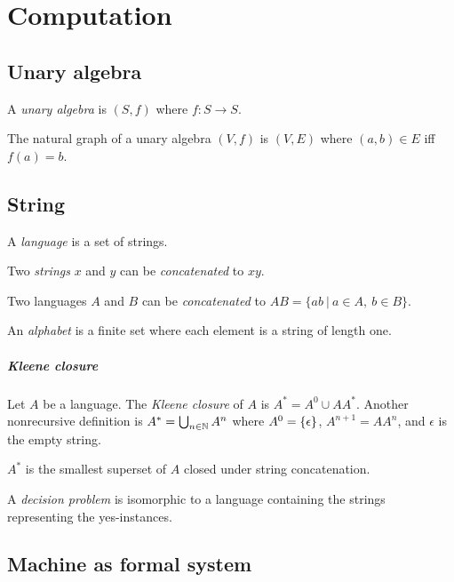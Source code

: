 \chapter{Computation}

\section{Unary algebra}

%
A \emph{unary algebra} is \((S,f)\) where \(f : S \to S\).

The natural graph of a unary algebra \((V,f)\) is \((V,E)\)
where \((a,b) \in E\) iff \(f(a) = b\).

\section{String}

%
A \emph{language} is a set of strings.

Two
%
\emph{strings}
\(x\) and \(y\) can be
%
%
\emph{concatenated} to \(xy\).

Two languages \(A\) and \(B\) can be
%
%
\emph{concatenated} to
\(AB = \{ ab ~|~ a \in A, ~ b \in B \}\).

%
An \emph{alphabet} is a finite set where each element is a string of length one.

\paragraph{Kleene closure}
Let \(A\) be a language.
The
%
%
%
\emph{Kleene closure}
of \(A\) is \(A^* = A^0 \cup AA^*\).
Another nonrecursive definition is
\( A^* = \bigcup_{n \in \mathbb{N}} A^n \)
where \( A^0 = \{\epsilon\} \),
\( A^{n+1} = A A^n \),
and \(\epsilon\) is the
%
%
empty string.

\(A^*\) is the smallest superset of \(A\)
closed under string concatenation.

A \emph{decision problem} is isomorphic to a language
containing the strings representing the yes-instances.

\section{Machine as formal system}

